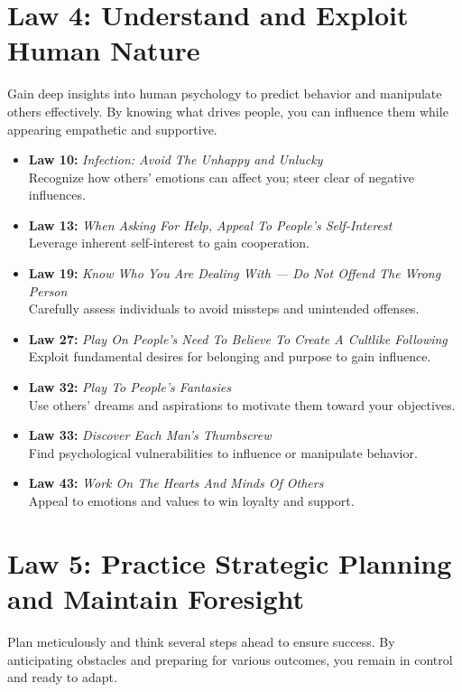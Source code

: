 \documentclass[a4paper,10.8pt]{article}
\begin{document}
\section*{Law 4: Understand and Exploit Human Nature}
Gain deep insights into human psychology to predict behavior and manipulate others effectively. By knowing what drives people, you can influence them while appearing empathetic and supportive.

\begin{itemize}[leftmargin=*, label={--}]
    \item \textbf{Law 10:} \textit{Infection: Avoid The Unhappy and Unlucky} \\
    Recognize how others' emotions can affect you; steer clear of negative influences.
    
    \item \textbf{Law 13:} \textit{When Asking For Help, Appeal To People's Self-Interest} \\
    Leverage inherent self-interest to gain cooperation.
    
    \item \textbf{Law 19:} \textit{Know Who You Are Dealing With — Do Not Offend The Wrong Person} \\
    Carefully assess individuals to avoid missteps and unintended offenses.
    
    \item \textbf{Law 27:} \textit{Play On People's Need To Believe To Create A Cultlike Following} \\
    Exploit fundamental desires for belonging and purpose to gain influence.
    
    \item \textbf{Law 32:} \textit{Play To People's Fantasies} \\
    Use others' dreams and aspirations to motivate them toward your objectives.
    
    \item \textbf{Law 33:} \textit{Discover Each Man's Thumbscrew} \\
    Find psychological vulnerabilities to influence or manipulate behavior.
    
    \item \textbf{Law 43:} \textit{Work On The Hearts And Minds Of Others} \\
    Appeal to emotions and values to win loyalty and support.
\end{itemize}

\section*{Law 5: Practice Strategic Planning and Maintain Foresight}
Plan meticulously and think several steps ahead to ensure success. By anticipating obstacles and preparing for various outcomes, you remain in control and ready to adapt.
\end{document}
